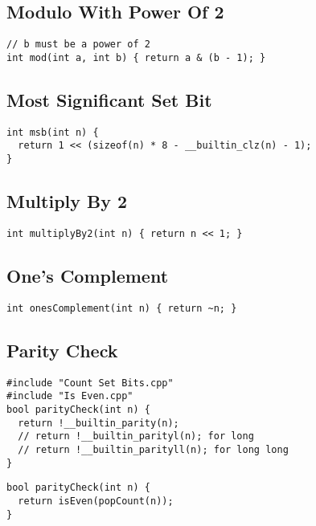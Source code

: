 \documentclass[twoside]{article}
\begin{document}
\begin{multicols*}{2}
\subsectionfont{\large\bfseries\sffamily\underline}
\subsection*{Modulo With Power Of 2}
\begin{verbatim}
// b must be a power of 2
int mod(int a, int b) { return a & (b - 1); }
\end{verbatim}

\subsectionfont{\large\bfseries\sffamily\underline}
\subsection*{Most Significant Set Bit}
\begin{verbatim}
int msb(int n) {
  return 1 << (sizeof(n) * 8 - __builtin_clz(n) - 1);
}
\end{verbatim}

\subsectionfont{\large\bfseries\sffamily\underline}
\subsection*{Multiply By 2}
\begin{verbatim}
int multiplyBy2(int n) { return n << 1; }
\end{verbatim}

\subsectionfont{\large\bfseries\sffamily\underline}
\subsection*{One's Complement}
\begin{verbatim}
int onesComplement(int n) { return ~n; }
\end{verbatim}

\subsectionfont{\large\bfseries\sffamily\underline}
\subsection*{Parity Check}
\begin{verbatim}
#include "Count Set Bits.cpp"
#include "Is Even.cpp"
bool parityCheck(int n) {
  return !__builtin_parity(n);
  // return !__builtin_parityl(n); for long
  // return !__builtin_parityll(n); for long long
}
\end{verbatim}
\vspace{-12pt}
\begin{verbatim}
bool parityCheck(int n) {
  return isEven(popCount(n));
}
\end{verbatim}


\end{multicols*}
\end{document}

